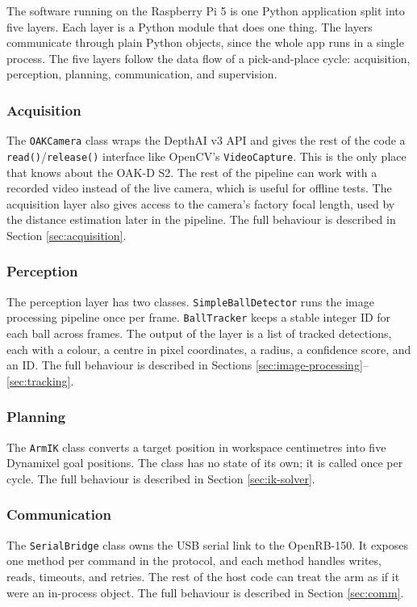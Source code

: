 \label{sec:software-architecture}
The software running on the Raspberry Pi 5 is one Python application
split into five layers. Each layer is a Python module that does one
thing. The layers communicate through plain Python objects, since the
whole app runs in a single process.
The five layers follow the data flow of a pick-and-place cycle:
acquisition, perception, planning, communication, and supervision.
\subsubsection*{Acquisition}
The \texttt{OAKCamera} class wraps the DepthAI v3 API and gives the
rest of the code a \texttt{read()}/\texttt{release()} interface like
OpenCV's \texttt{VideoCapture}. This is the only place that knows
about the OAK-D S2. The rest of the pipeline can work with a recorded
video instead of the live camera, which is useful for offline tests.
The acquisition layer also gives access to the camera's factory
focal length, used by the distance estimation later in the pipeline.
The full behaviour is described in Section \ref{sec:acquisition}.
\subsubsection*{Perception}
The perception layer has two classes. \texttt{SimpleBallDetector} runs
the image processing pipeline once per frame. \texttt{BallTracker}
keeps a stable integer ID for each ball across frames. The output of
the layer is a list of tracked detections, each with a colour, a
centre in pixel coordinates, a radius, a confidence score, and an ID.
The full behaviour is described in
Sections \ref{sec:image-processing}--\ref{sec:tracking}.
\subsubsection*{Planning}
The \texttt{ArmIK} class converts a target position in workspace
centimetres into five Dynamixel goal positions. The class has no
state of its own; it is called once per cycle. The full behaviour is
described in Section \ref{sec:ik-solver}.
\subsubsection*{Communication}
The \texttt{SerialBridge} class owns the USB serial link to the
OpenRB-150. It exposes one method per command in the protocol, and
each method handles writes, reads, timeouts, and retries. The rest
of the host code can treat the arm as if it were an in-process object.
The full behaviour is described in Section \ref{sec:comm}.
